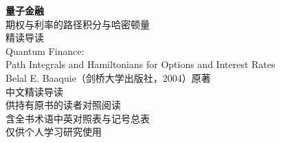 \documentclass[11pt,a4paper,twoside,openright]{ctexbook}
\begin{document}
\frontmatter
\begin{titlepage}
\centering
{\Huge\bfseries 量子金融\\[0.8em]}
{\LARGE 期权与利率的路径积分与哈密顿量\\[0.4em]}
{\LARGE 精读导读\\[5em]}
{\Large Quantum Finance:\\
Path Integrals and Hamiltonians for Options and Interest Rates\\[3em]}
{\Large Belal E. Baaquie（剑桥大学出版社，2004）原著\\[1.5em]}
{\large 中文精读导读\\[0.5em]}
{\large 供持有原书的读者对照阅读\\[0.3em]
含全书术语中英对照表与记号总表\\[3em]}
{\large 仅供个人学习研究使用\\[2em]}
\end{titlepage}
\thispagestyle{empty}\mbox{}\clearpage


\tableofcontents

\mainmatter

















\appendix



\end{document}
